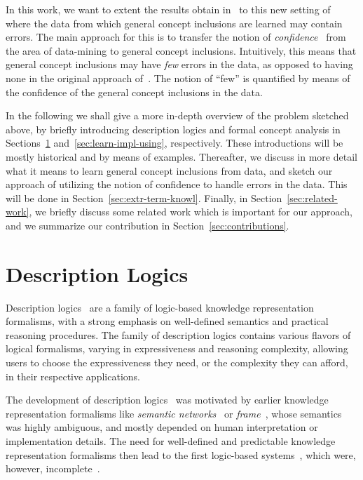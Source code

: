 In this work, we want to extent the results obtain in~\cite{Diss-Felix} to this new
setting of where the data from which general concept inclusions are learned may contain
errors.  The main approach for this is to transfer the notion of
\emph{confidence}~\cite{arules:agrawal:association-rules} from the area of data-mining to
general concept inclusions.  Intuitively, this means that general concept inclusions may
have \emph{few} errors in the data, as opposed to having none in the original approach
of~\cite{Diss-Felix}.  The notion of ``few'' is quantified by means of the confidence of
the general concept inclusions in the data.

In the following we shall give a more in-depth overview of the problem sketched above, by
briefly introducing description logics and formal concept analysis in
Sections~\ref{sec:repr-knowl-using} and~\ref{sec:learn-impl-using}, respectively.  These
introductions will be mostly historical and by means of examples.  Thereafter, we discuss
in more detail what it means to learn general concept inclusions from data, and sketch our
approach of utilizing the notion of confidence to handle errors in the data.  This will be
done in Section~\ref{sec:extr-term-knowl}.  Finally, in Section~\ref{sec:related-work}, we
briefly discuss some related work which is important for our approach, and we summarize
our contribution in Section~\ref{sec:contributions}.

\section{Description Logics}
\label{sec:repr-knowl-using}

Description logics~\cite{DLhandbook} are a family of logic-based knowledge representation
formalisms, with a strong emphasis on well-defined semantics and practical reasoning
procedures.  The family of description logics contains various flavors of logical
formalisms, varying in expressiveness and reasoning complexity, allowing users to choose
the expressiveness they need, or the complexity they can afford, in their respective
applications.

The development of description logics~\cite{baader01overview} was motivated by earlier
knowledge representation formalisms like \emph{semantic networks}~\cite{SemanticNetworks}
or \emph{frame}~\cite{Minsky-Frames}, whose semantics was highly ambiguous, and mostly
depended on human interpretation or implementation details.  The need for well-defined and
predictable knowledge representation formalisms then lead to the first logic-based
systems~\cite{journals/cogsci/BrachmanS85}, which were, however,
incomplete~\cite{conf/kr/Schmidt-Schauss89}.

